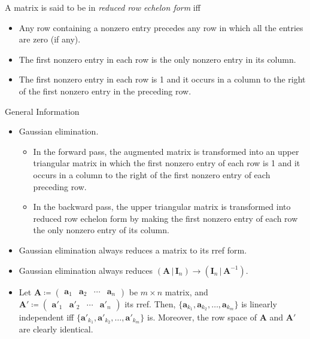 \begin{definition}{}{}
    A matrix is said to be in \emph{reduced row echelon form} iff
        \begin{itemize}
            \item Any row containing a nonzero entry precedes any row in which all the entries are zero (if any).
            \item The first nonzero entry in each row is the only nonzero entry in its column.
            \item The first nonzero entry in each row is 1 and it occurs in a column to the right of the first nonzero entry in the preceding row.
        \end{itemize}
\end{definition}
\begin{stbox}{General Information}
    \begin{itemize}
        \item Gaussian elimination. 
        \begin{itemize}
            \item In the forward pass, the augmented matrix is transformed into an upper triangular matrix in which the first nonzero entry of each row is 1 and it occurs in a column to the right of the first nonzero entry
            of each preceding row.
            \item  In the backward pass, the upper triangular matrix is transformed into reduced row echelon form by making the first nonzero entry of each row the only nonzero entry of its column.
        \end{itemize}
        \item Gaussian elimination always reduces a matrix to its rref form.
        \item Gaussian elimination always reduces \((\mathbf{A} \,\vert\, \mathbf{I}_n)\to (\mathbf{I}_n \,\vert\, \mathbf{A}^{-1})\).
        \item Let \(\mathbf{A}\coloneq
        \begin{pmatrix}
            \mathbf{a}_1&\mathbf{a}_2&\cdots&\mathbf{a}_n
        \end{pmatrix}\) be \(m\times n\) matrix, and \(\mathbf{A}'\coloneq
        \begin{pmatrix}
            \mathbf{a}'_1&\mathbf{a}'_2&\cdots&\mathbf{a}'_n
        \end{pmatrix}\) its rref. Then, \(\{\mathbf{a}_{k_1},\mathbf{a}_{k_2},\dots,\mathbf{a}_{k_m}\}\) is linearly independent iff \(\{\mathbf{a}'_{k_1},\mathbf{a}'_{k_2},\dots,\mathbf{a}'_{k_m}\}\) is. Moreover, the row space of \(\mathbf{A}\) and \(\mathbf{A}'\) are clearly identical.

\end{itemize}
\end{stbox}
